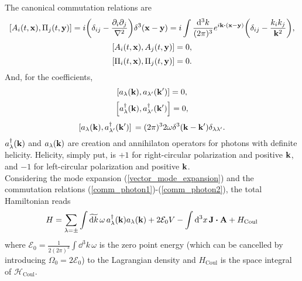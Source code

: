 The canonical commutation relations are
\begin{equation}
    \comm{A_i(t,\vb{x})}{\Pi_j(t,\vb{y})}=i\qty(\delta_{ij}-\frac{\partial_i\partial_j}{\laplacian})\delta^3(\vb{x}-\vb{y})=i\int\frac{\dd^3 k}{(2\pi)^3}e^{i\vb{k}\vdot(\vb{x}-\vb{y})}\qty(\delta_{ij}-\frac{k_ik_j}{\vb{k}^2}),
\end{equation}
\begin{equation}
    \comm{A_i(t,\vb{x})}{A_j(t,\vb{y})}=0,
\end{equation}
\begin{equation}
    \comm{\Pi_i(t,\vb{x})}{\Pi_j(t,\vb{y})}=0.
\end{equation}
And, for the coefficients,
\begin{equation}
    \comm{a_\lambda(\vb{k})}{a_{\lambda^\prime}(\vb{k}^\prime)}=0,
    \label{comm_photon1}
\end{equation}
\begin{equation}
    \comm{a^\dagger_\lambda(\vb{k})}{a^\dagger_{\lambda^\prime}(\vb{k}^\prime)}=0,
\end{equation}
\begin{equation}
    \comm*{a_\lambda(\vb{k})}{a^\dagger_{\lambda^\prime}(\vb{k}^\prime)}=(2\pi)^32\omega\delta^3(\vb{k}-\vb{k}^\prime)\delta_{\lambda\lambda^\prime}.
    \label{comm_photon2}
\end{equation}
$a^\dagger_\lambda(\vb{k})$ and $a_\lambda(\vb{k})$ are creation and annihilaton operators for photons with definite helicity. Helicity, simply put, is $+1$ for right-circular polarization and positive $\vb{k}$, and $-1$ for left-circular polarization and positive $\vb{k}$.\\

Considering the mode expansion (\ref{vector_mode_expansion}) and the commutation relations (\ref{comm_photon1})-(\ref{comm_photon2}), the total Hamiltonian reads
\begin{equation}
    H=\sum_{\lambda=\pm}\int\widetilde{\dd k}\, \omega\, a^\dagger_{\lambda}(\vb{k})a_\lambda(\vb{k})+2\mathcal{E}_0V-\int\dd^3x\, \vb{J}\vdot\vb{A}+H_{\text{Coul}}
\end{equation}
where $\mathcal{E}_0=\frac{1}{2(2\pi)^3}\int\dd^3 k\,\omega$ is the zero point energy (which can be cancelled by introducing $\Omega_0=2\mathcal{E}_0$) to the Lagrangian density and $H_{\text{Coul}}$ is the space integral of $\mathcal{H}_{\text{Coul}}$.